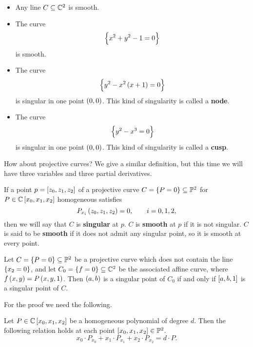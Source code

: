 \begin{example}
\hfill
\begin{itemize}
\item Any line $ C \subseteq \mathbb{C}^2 $ is smooth.
\item The curve
$$ \cbr{x^2 + y^2 - 1 = 0} $$
is smooth.
\item The curve
$$ \cbr{y^2 - x^2\br{x + 1} = 0} $$
is singular in one point $ \br{0, 0} $. This kind of singularity is called a \textbf{node}.
\item The curve
$$ \cbr{y^2 - x^3 = 0} $$
is singular in one point $ \br{0, 0} $. This kind of singularity is called a \textbf{cusp}.
\end{itemize}
\end{example}

How about projective curves? We give a similar definition, but this time we will have three variables and three partial derivatives.

\begin{definition}
If a point $ p = \sbr{z_0, z_1, z_2} $ of a projective curve $ C = \cbr{P = 0} \subseteq \P^2 $ for $ P \in \C\sbr{x_0, x_1, x_2} $ homogeneous satisfies
$$ P_{x_i}\br{z_0, z_1, z_2} = 0, \qquad i = 0, 1, 2, $$
then we will say that $ C $ is \textbf{singular} at $ p $. $ C $ is \textbf{smooth} at $ p $ if it is not singular. $ C $ is said to be \textbf{smooth} if it does not admit any singular point, so it is smooth at every point.
\end{definition}

\begin{lemma}
\label{lem:7.5}
Let $ C = \cbr{P = 0} \subseteq \P^2 $ be a projective curve which does not contain the line $ \cbr{x_2 = 0} $, and let $ C_0 = \cbr{f = 0} \subseteq \C^2 $ be the associated affine curve, where $ f\br{x, y} = P\br{x, y, 1} $. Then $ \br{a, b} $ is a singular point of $ C_0 $ if and only if $ \sbr{a, b, 1} $ is a singular point of $ C $.
\end{lemma}

\pagebreak

For the proof we need the following.

\begin{theorem}
\label{thm:7.6}
Let $ P \in \C\sbr{x_0, x_1, x_2} $ be a homogeneous polynomial of degree $ d $. Then the following relation holds at each point $ \sbr{x_0, x_1, x_2} \in \P^2 $.
$$ x_0 \cdot P_{x_0} + x_1 \cdot P_{x_1} + x_2 \cdot P_{x_2} = d \cdot P. $$
\end{theorem}


